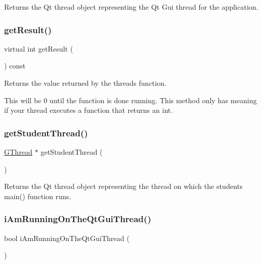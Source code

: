 Returns the Qt thread object representing the Qt Gui thread for the application. 

\mbox{\label{classGThread_a6cfc0f4e3b2174fde084cd1865f2c9e9}} 
\subsubsection{\texorpdfstring{get\+Result()}{getResult()}}
{\footnotesize\ttfamily virtual int get\+Result (\begin{DoxyParamCaption}{ }\end{DoxyParamCaption}) const\hspace{0.3cm}{\ttfamily [pure virtual]}}



Returns the value returned by the thread\textquotesingle{}s function. 

This will be 0 until the function is done running. This method only has meaning if your thread executes a function that returns an int. \mbox{\label{classGThread_ae3c433f1db9de03fe8a6aa83dbc689ed}} 
\subsubsection{\texorpdfstring{get\+Student\+Thread()}{getStudentThread()}}
{\footnotesize\ttfamily \mbox{\hyperlink{classGThread}{G\+Thread}} $\ast$ get\+Student\+Thread (\begin{DoxyParamCaption}{ }\end{DoxyParamCaption})\hspace{0.3cm}{\ttfamily [static]}}



Returns the Qt thread object representing the thread on which the student\textquotesingle{}s main() function runs. 

\mbox{\label{classGThread_a410c93ed2a5eb78ea24013ef35e49eed}} 
\subsubsection{\texorpdfstring{i\+Am\+Running\+On\+The\+Qt\+Gui\+Thread()}{iAmRunningOnTheQtGuiThread()}}
{\footnotesize\ttfamily bool i\+Am\+Running\+On\+The\+Qt\+Gui\+Thread (\begin{DoxyParamCaption}{ }\end{DoxyParamCaption})\hspace{0.3cm}{\ttfamily [static]}}



